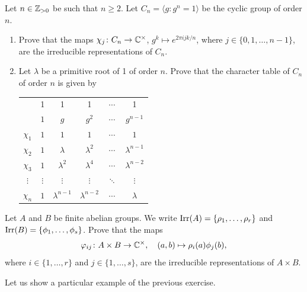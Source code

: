 \begin{exercise}
	Let $n\in\mathbb{Z}_{>0}$ be such that $n\geq2$. Let 
$C_n=\langle g:g^n=1\rangle$ be the cyclic group of order $n$.
\begin{enumerate}
    \item Prove that the maps  
        $\chi_j\colon C_n\to\mathbb{C}^\times$, $g^k\mapsto e^{2\pi ijk/n}$, where $j\in\{0,1,\dots,n-1\}$, 
        are the irreducible representations of $C_n$. 
    \item Let $\lambda$ be a primitive root of 1 of order $n$. Prove that 
        the character table of $C_n$ of order $n$ is given by 
	\begin{center}
		\begin{tabular}{|c|ccccc|}
			\hline 
			& 1 & 1 & 1 & $\cdots$ & 1\tabularnewline
			& $1$ & $g$ & $g^2$ & $\cdots$ & $g^{n-1}$\tabularnewline
			\hline 
			$\chi_{1}$ & $1$ & $1$ & $1$ & $\cdots$ & $1$\tabularnewline
			$\chi_{2}$ & $1$ & $\lambda$ & $\lambda^2$ & $\cdots$ & $\lambda^{n-1}$\tabularnewline
			$\chi_{3}$ & $1$ & $\lambda^2$ & $\lambda^4$ & $\cdots$ & $\lambda^{n-2}$\tabularnewline
			$\vdots$ & $\vdots$ & $\vdots$ & $\vdots$ & $\ddots$ & $\vdots$\tabularnewline
			$\chi_{n}$ & $1$ & $\lambda^{n-1}$ & $\lambda^{n-2}$ & $\cdots$ & $\lambda$\tabularnewline
			\hline
		\end{tabular}
	\end{center}
\end{enumerate}
\end{exercise}

\begin{exercise}
    Let $A$ and $B$ be finite abelian groups. We write $\operatorname{Irr}(A)=\{\rho_1,\dots,\rho_r\}$ and 
    $\operatorname{Irr}(B)=\{\phi_1,\dots,\phi_s\}$. Prove
    that the maps 
    \[
    \varphi_{ij}\colon A\times B\to\mathbb{C}^\times,\quad
    (a,b)\mapsto\rho_i(a)\phi_j(b),
    \]
    where $i\in\{1,\dots,r\}$ and $j\in\{1,\dots,s\}$, are the irreducible representations of $A\times B$. 
\end{exercise}

Let us show a particular example of the previous exercise. 

